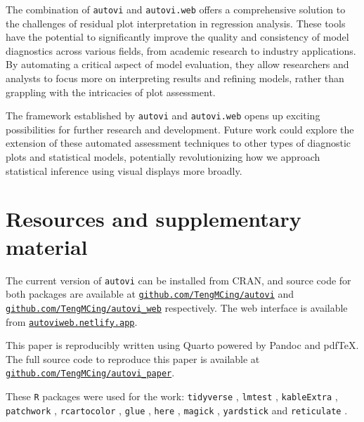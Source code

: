 \documentclass[
doublespace,
  times]{anzsauth}
\begin{document}
The combination of \texttt{autovi} and \texttt{autovi.web} offers a
comprehensive solution to the challenges of residual plot interpretation
in regression analysis. These tools have the potential to significantly
improve the quality and consistency of model diagnostics across various
fields, from academic research to industry applications. By automating a
critical aspect of model evaluation, they allow researchers and analysts
to focus more on interpreting results and refining models, rather than
grappling with the intricacies of plot assessment.

The framework established by \texttt{autovi} and \texttt{autovi.web}
opens up exciting possibilities for further research and development.
Future work could explore the extension of these automated assessment
techniques to other types of diagnostic plots and statistical models,
potentially revolutionizing how we approach statistical inference using
visual displays more broadly.

\section{Resources and supplementary
material}\label{resources-and-supplementary-material}

The current version of \texttt{autovi} can be installed from CRAN, and
source code for both packages are available at
\href{https://github.com/TengMCing/autovi}{\texttt{github.com/TengMCing/autovi}}
and
\href{https://github.com/TengMCing/autovi_web}{\texttt{github.com/TengMCing/autovi\_web}}
respectively. The web interface is available from
\href{https://autoviweb.netlify.app/}{\texttt{autoviweb.netlify.app}}.

This paper is reproducibly written using Quarto
\citep{Allaire_Quarto_2024} powered by Pandoc \citep{MacFarlane_Pandoc}
and pdfTeX. The full source code to reproduce this paper is available at
\href{https://github.com/TengMCing/autovi_paper}{\texttt{github.com/TengMCing/autovi\_paper}}.

These \texttt{R} packages were used for the work: \texttt{tidyverse}
\citep{tidyverse}, \texttt{lmtest} \citep{lmtest}, \texttt{kableExtra}
\citep{kableextra}, \texttt{patchwork} \citep{patchwork},
\texttt{rcartocolor} \citep{rcartocolor}, \texttt{glue} \citep{glue},
\texttt{here} \citep{here}, \texttt{magick} \citep{magick},
\texttt{yardstick} \citep{yardstick} and \texttt{reticulate}
\citep{reticulate}.


  
\end{document}
